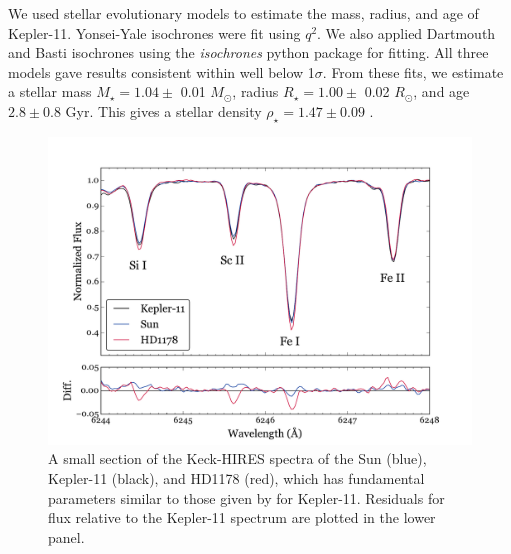 \documentclass[oneside]{emulateapj}
\begin{document}
We used stellar evolutionary models to estimate the mass, radius, and age of Kepler-11. Yonsei-Yale isochrones were fit using $q^2$. We also applied Dartmouth and Basti isochrones using the \textit{isochrones} python package for fitting. All three models gave results consistent within well below 1$\sigma$. From these fits, we estimate a stellar mass $M_{\star} = 1.04 \pm$ 0.01 $M_{\odot}$, radius $R_{\star} = 1.00 \pm$ 0.02 $R_{\odot}$, and age $2.8 \pm 0.8$ Gyr. This gives a stellar density $\rho_{\star} = 1.47 \pm 0.09$ \gcm.

\begin{figure}
\centering
\includegraphics[width=\columnwidth]{spec}
\caption{A small section of the Keck-HIRES spectra of the Sun (blue), Kepler-11 (black), and HD1178 (red), which has fundamental parameters similar to those given by \citet{Lissauer2013} for Kepler-11. Residuals for flux relative to the Kepler-11 spectrum are plotted in the lower panel.}
\label{fig:spec}
\end{figure}
\end{document}
